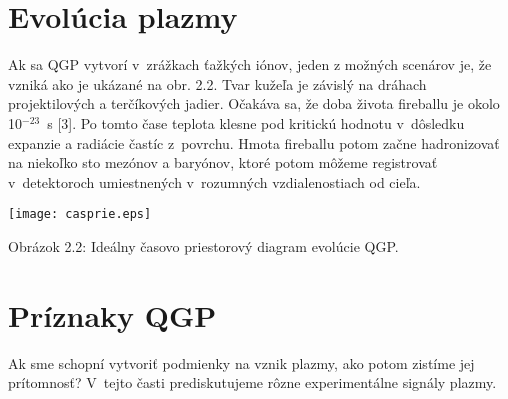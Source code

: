 %
%
%
%

\section{Evolúcia plazmy}
Ak sa QGP vytvorí v~zrážkach ťažkých iónov,
jeden z možných scenárov je, že vzniká ako je ukázané na obr. 2.2.
Tvar kužeľa je závislý na dráhach projektilových a
terčíkových  jadier. Očakáva sa, že doba
života fireballu   je okolo  10$^{-23}$~s [3]. Po tomto čase
teplota klesne pod kritickú hodnotu v~dôsledku expanzie a radiácie
častíc z~povrchu. Hmota fireballu potom začne
hadronizovať na niekoľko sto mezónov a baryónov, ktoré
potom môžeme
registrovať v~detektoroch umiestnených v~rozumných vzdialenostiach
od cieľa.
\begin{center}
  \texttt{[image: casprie.eps]}
\end{center}
\begin{center}
  Obrázok 2.2: Ideálny časovo priestorový diagram evolúcie QGP.
\end{center}

\section{Príznaky QGP}
Ak sme schopní vytvoriť podmienky na vznik plazmy, ako potom
zistíme jej prí\-tom\-nosť? V~tejto časti prediskutujeme
rôzne experimentálne signály plazmy.

